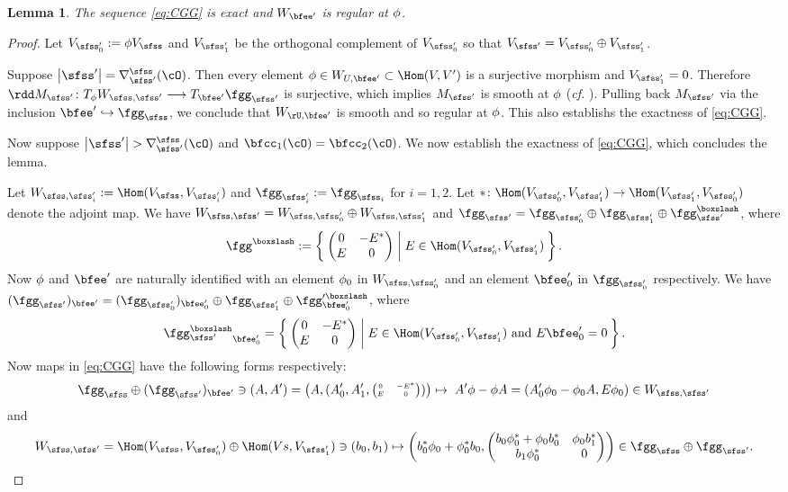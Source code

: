 \documentclass[12pt,a4paper]{amsart}
\def\abs#1{\left|{#1}\right|}
\newcommand{\E}{\mathbf{E}}
\numberwithin{equation}{section}
\newtheorem{lem}[thm]{Lemma}
\theoremstyle{remark}
\def\UU{\rU}
\def\cf{\emph{cf.} }
\begin{document}
\begin{lem}\label{lem:CGG}
The sequence \eqref{eq:CGG} is exact and $W_{\Xp}$ is regular at $\phi$.
\end{lem}
\begin{proof}

  Let $\Vspo:=\ww \Vs$ and $\Vspt$ be the orthogonal complement of $\Vspo$ so
  that $\Vsp = \Vspo\oplus \Vspt$.

  Suppose $\abs{\sfss'} = \DDss(\cO)$. Then every element
  $\ww\in W_{U,\Xp}\subset \Hom(V,V')$ is a surjective morphism and $\Vspt=0$.
  Therefore $\rdd \Msp \colon T_{\ww} \Wss \longrightarrow T_{\Xp}\fggsp$ is
  surjective, which implies $\Msp$ is smooth at $\phi$ (\cf
  \cite[Proposition~10.4]{HS}). Pulling back $\Msp$ via the inclusion
  $\Xp \hookrightarrow \fggs$, we conclude that $W_{\UU,\Xp}$ is smooth and so
  regular at $\phi$. This also establishs the exactness of \eqref{eq:CGG}.

  \smallskip

  Now suppose $\abs{\sfss'}>\DDss(\cO)$ and $\bfcc_{1}(\cO) = \bfcc_{2}(\cO)$.
  We now establish the exactness of \eqref{eq:CGG}, which concludes the lemma.


  Let $\Wssi := \Hom(\Vs,\Vspi)$ and $\fggspi := \fgg_{\sfss_{i}}$ for $i=1,2$.
  Let $*\colon \Hom(\Vspo,\Vspt) \rightarrow \Hom(\Vspt,\Vspo)$ denote the
  adjoint map. We have $\Wss =\Wsso \oplus \Wsst$ and
  $\fggsp = \fggspo\oplus \fggspt \oplus \fggpsb$, where
  \[ \fgg^{\boxslash}:= \Set{\begin{pmatrix}
        0 & -E^*\\
        E & 0
      \end{pmatrix}|E\in \Hom(\Vspo,\Vspt)}.
  \]
  Now $\phi$ and $\Xp$ are naturally identified with an element $\phi_0$ in $\Wsso$
  and an element $\Xpo$ in $\fggspo$ respectively. We have
  $(\fggsp)_{\Xp} = (\fggspo)_{\Xpo} \oplus \fggspt \oplus \fgg'^{\boxslash}_{\Xpo}$,
  where %
  \[ \fggpsb_{\Xpo} = \Set{\begin{pmatrix}
        0 & -E^*\\
        E & 0
      \end{pmatrix}|E\in \Hom(\Vspo,\Vspt) \text{ and } E \Xpo = 0}.
  \]
  Now maps in \eqref{eq:CGG} have the following forms respectively:
  \[
    \fggs \oplus (\fggsp)_{\Xp}\ni (A,A') = \left(A, ( A'_0,A'_1,
      {\tiny \begin{pmatrix}0 & -E^*\\E &0\end{pmatrix}})\right) \mapsto
    \; A'\ww - \ww A= (A'_0 \wwo - \wwo A, E \wwo)\in \Wss
  \] and
  \[
    \Wss=\Hom(\Vs,\Vspo)\oplus \Hom(Vs,\Vspt) \ni (b_0,b_1) \mapsto \left(b_0^* \wwo + \wwo^* b_0, \begin{pmatrix}
        b_0 \wwo^* + \wwo b_0^* & \wwo b_1^*\\
        b_1 \wwo^* & 0
      \end{pmatrix}\right)\in \fggs\oplus \fggsp.
  \]



\end{proof}
\end{document}
